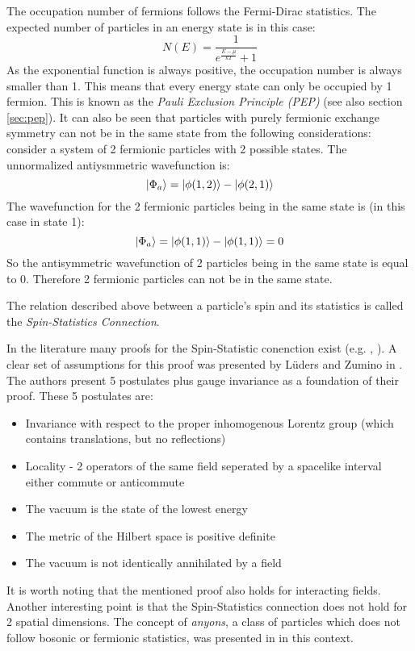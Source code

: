 The occupation number of fermions follows the Fermi-Dirac statistics. The expected number of particles in an energy state is in this case:
\begin{equation}
 N(E) = \frac{1}{e^{\frac{E-\mu}{kT}}+1}
\end{equation} 
As the exponential function is always positive, the occupation number is always smaller than 1. This means that every energy state can only be occupied by 1 fermion. This is known as the \textit{Pauli Exclusion Principle (PEP)} (see also section \ref{sec:pep}). It can also be seen that particles with purely fermionic exchange symmetry can not be in the same state from the following considerations: consider a system of 2 fermionic particles with 2 possible states. The unnormalized antiysmmetric wavefunction is:
\begin{equation}
 \ket{\Phi_{a}} = \ket{\phi(1,2)} - \ket{\phi(2,1)} 
\end{equation} 
The wavefunction for the 2 fermionic particles being in the same state is (in this case in state 1):
\begin{equation}
 \ket{\Phi_{a}} = \ket{\phi(1,1)} - \ket{\phi(1,1)} = 0
\end{equation} 
So the antisymmetric wavefunction of 2 particles being in the same state is equal to 0. Therefore 2 fermionic particles can not be in the same state.

The relation described above between a particle's spin and its statistics is called the \textit{Spin-Statistics Connection}. 

In the literature many proofs for the Spin-Statistic conenction exist (e.g. \cite{Pauli1940}, \cite{Schwinger1958}). A clear set of assumptions for this proof was presented by Lüders and Zumino in \cite{Luders1958}. The authors present 5 postulates plus gauge invariance as a foundation of their proof. These 5 postulates are:
\begin{itemize}
 \item Invariance with respect to the proper inhomogenous Lorentz group (which contains translations, but no reflections)
 \item Locality - 2 operators of the same field seperated by a spacelike interval either commute or anticommute
 \item The vacuum is the state of the lowest energy
 \item The metric of the Hilbert space is positive definite
 \item The vacuum is not identically annihilated by a field
\end{itemize}
It is worth noting that the mentioned proof also holds for interacting fields. Another interesting point is that the Spin-Statistics connection does not hold for 2 spatial dimensions. The concept of \textit{anyons}, a class of particles which does not follow bosonic or fermionic statistics, was presented in \cite{Stern2008} in this context.

